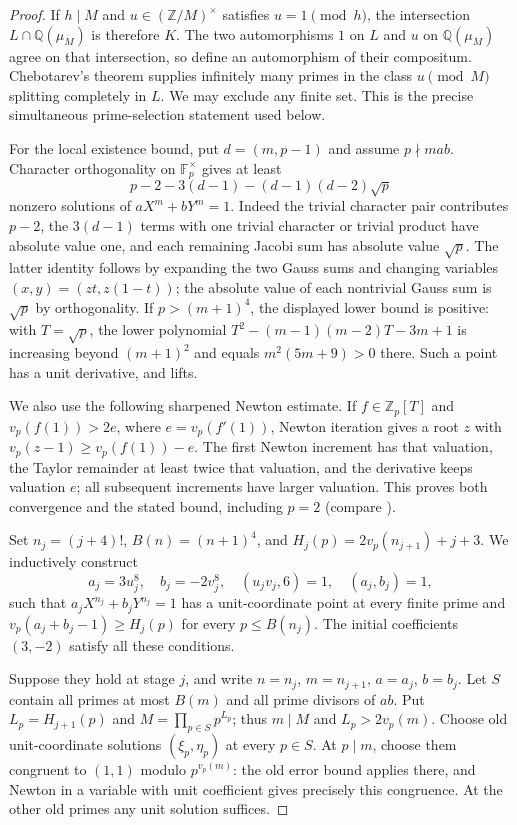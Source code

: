 \begin{proof}
If $h\mid M$ and $u\in(\mathbb Z/M)^\times$ satisfies
$u=1\pmod h$, the intersection
$L\cap\mathbb Q(\mu_M)$ is therefore $K$.
The two automorphisms $1$ on $L$ and $u$ on $\mathbb Q(\mu_M)$ agree
on that intersection, so define an automorphism of their compositum.
Chebotarev's theorem \citep[Theorem 8.31, p.~147]{MilneANT2020} supplies
infinitely many primes in the class $u\pmod M$ splitting completely
in $L$. We may exclude any finite set. This is the precise simultaneous
prime-selection statement used below.

For the local existence bound, put $d=(m,p-1)$ and assume $p\nmid mab$.
Character orthogonality on $\mathbb F_p^\times$ gives at least
\[
p-2-3(d-1)-(d-1)(d-2)\sqrt p
\]
nonzero solutions of $aX^m+bY^m=1$. Indeed the trivial character pair
contributes $p-2$, the $3(d-1)$ terms with one trivial character or
trivial product have absolute value one, and each remaining Jacobi sum
has absolute value $\sqrt p$. The latter identity follows by expanding
the two Gauss sums and changing variables $(x,y)=(zt,z(1-t))$; the
absolute value of each nontrivial Gauss sum is $\sqrt p$ by
orthogonality. If $p>(m+1)^4$, the displayed lower bound is positive:
with $T=\sqrt p$, the lower polynomial
$T^2-(m-1)(m-2)T-3m+1$ is increasing beyond $(m+1)^2$ and equals
$m^2(5m+9)>0$ there. Such a point has a unit derivative, and lifts.

We also use the following sharpened Newton estimate. If
$f\in\mathbb Z_p[T]$ and $v_p(f(1))>2e$, where
$e=v_p(f'(1))$, Newton iteration gives a root $z$ with
$v_p(z-1)\ge v_p(f(1))-e$. The first Newton increment has that
valuation, the Taylor remainder at least twice that valuation, and the
derivative keeps valuation $e$; all subsequent increments have larger
valuation. This proves both convergence and the stated bound, including
$p=2$ (compare \citealp[Theorem 7.32 and the sharper bound on p.~121]{MilneANT2020}).

Set $n_j=(j+4)!$, $B(n)=(n+1)^4$, and
$H_j(p)=2v_p(n_{j+1})+j+3$. We inductively construct
\[
a_j=3u_j^8,\quad b_j=-2v_j^8,\quad (u_jv_j,6)=1,
\quad (a_j,b_j)=1,
\]
such that $a_jX^{n_j}+b_jY^{n_j}=1$ has a unit-coordinate point at
every finite prime and
$v_p(a_j+b_j-1)\ge H_j(p)$ for every $p\le B(n_j)$.
The initial coefficients $(3,-2)$ satisfy all these conditions.

Suppose they hold at stage $j$, and write $n=n_j$, $m=n_{j+1}$,
$a=a_j$, $b=b_j$. Let $S$ contain all primes at most $B(m)$ and all
prime divisors of $ab$. Put $L_p=H_{j+1}(p)$ and
$M=\prod_{p\in S}p^{L_p}$; thus $m\mid M$ and
$L_p>2v_p(m)$. Choose old unit-coordinate solutions
$(\xi_p,\eta_p)$ at every $p\in S$. At $p\mid m$, choose them
congruent to $(1,1)$ modulo $p^{v_p(m)}$: the old error bound applies
there, and Newton in a variable with unit coefficient gives precisely
this congruence. At the other old primes any unit solution suffices.


\end{proof}
